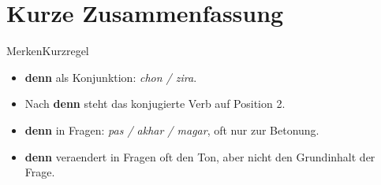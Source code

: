 \documentclass[a4paper,11pt]{article}
\begin{document}
\section{Kurze Zusammenfassung}

\begin{grammarentry}{Merken}{Kurzregel}
\begin{itemize}
    \item \textbf{denn} als Konjunktion: \textit{chon / zira}.
    \item Nach \textbf{denn} steht das konjugierte Verb auf Position 2.
    \item \textbf{denn} in Fragen: \textit{pas / akhar / magar}, oft nur zur Betonung.
    \item \textbf{denn} veraendert in Fragen oft den Ton, aber nicht den Grundinhalt der Frage.
\end{itemize}
\end{grammarentry}
\end{document}
